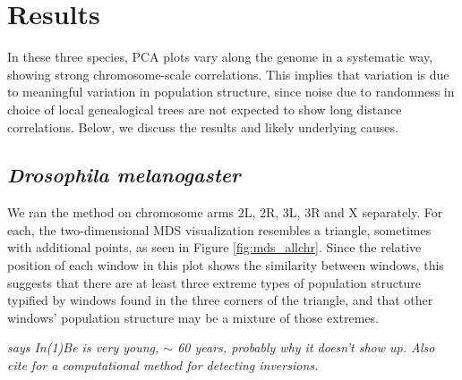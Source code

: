 \documentclass[11pt, oneside]{article}   	%
\newcommand{\plr}[1]{{\em \color{blue} #1}}
\begin{document}
\section{Results}

In these three species, PCA plots vary along the genome in a systematic way, showing strong chromosome-scale correlations.
This implies that variation is due to meaningful variation in population structure, 
since noise due to randomness in choice of local genealogical trees
are not expected to show long distance correlations. 
Below, we discuss the results and likely underlying causes.


\subsection{\textit{Drosophila melanogaster}}

We ran the method on chromosome arms 2L, 2R, 3L, 3R and X separately. 
For each, the two-dimensional MDS visualization resembles a triangle,
sometimes with additional points,
as seen in Figure \ref{fig:mds_allchr}.
Since the relative position of each window in this plot shows the similarity between windows, 
this suggests that there are at least three extreme types of population structure 
typified by windows found in the three corners of the triangle,
and that other windows' population structure may be a mixture of those extremes. 

\plr{\citet{corbett2012population} says In(1)Be is very young, $\sim$ 60 years, probably why it doesn't show up. 
Also cite \citet{corbettdetig2012sequencebased} for a computational method for detecting inversions.}
\end{document}
